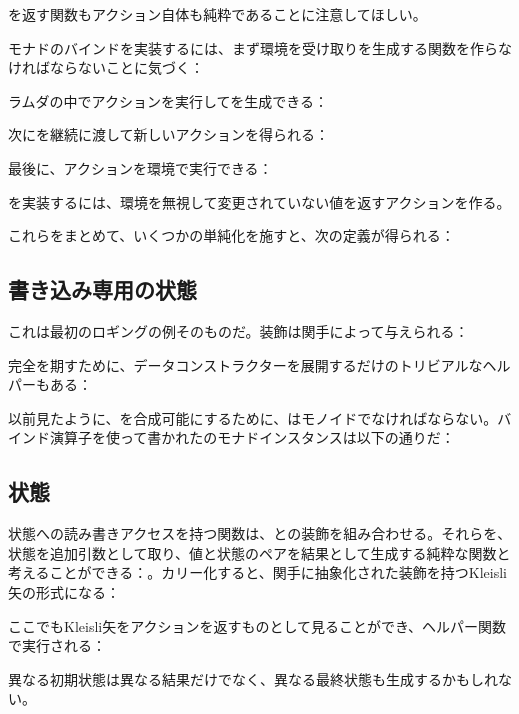 を返す関数もアクション自体も純粋であることに注意してほしい。

モナドのバインドを実装するには、まず環境を受け取りを生成する関数を作らなければならないことに気づく：

ラムダの中でアクションを実行してを生成できる：

次にを継続に渡して新しいアクションを得られる：

最後に、アクションを環境で実行できる：

を実装するには、環境を無視して変更されていない値を返すアクションを作る。

これらをまとめて、いくつかの単純化を施すと、次の定義が得られる：


\subsection{書き込み専用の状態}

これは最初のロギングの例そのものだ。装飾は関手によって与えられる：

完全を期すために、データコンストラクターを展開するだけのトリビアルなヘルパーもある：

以前見たように、を合成可能にするために、はモノイドでなければならない。バインド演算子を使って書かれたのモナドインスタンスは以下の通りだ：


\subsection{状態}

状態への読み書きアクセスを持つ関数は、との装飾を組み合わせる。それらを、状態を追加引数として取り、値と状態のペアを結果として生成する純粋な関数と考えることができる：。カリー化すると、関手に抽象化された装飾を持つKleisli矢の形式になる：

ここでもKleisli矢をアクションを返すものとして見ることができ、ヘルパー関数で実行される：

異なる初期状態は異なる結果だけでなく、異なる最終状態も生成するかもしれない。


